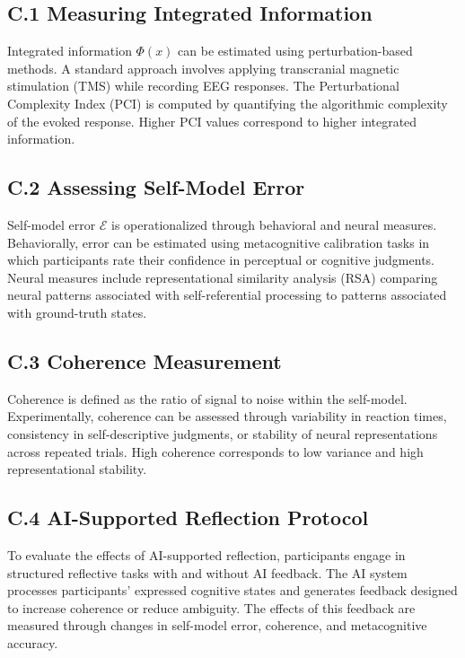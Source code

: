 \documentclass[12pt]{article}
\begin{document}
\subsection*{C.1 Measuring Integrated Information}

Integrated information $\Phi(x)$ can be estimated using perturbation-based methods. A standard approach involves applying transcranial magnetic stimulation (TMS) while recording EEG responses. The Perturbational Complexity Index (PCI) is computed by quantifying the algorithmic complexity of the evoked response. Higher PCI values correspond to higher integrated information.

\subsection*{C.2 Assessing Self-Model Error}

Self-model error $\mathcal{E}$ is operationalized through behavioral and neural measures. Behaviorally, error can be estimated using metacognitive calibration tasks in which participants rate their confidence in perceptual or cognitive judgments. Neural measures include representational similarity analysis (RSA) comparing neural patterns associated with self-referential processing to patterns associated with ground-truth states.

\subsection*{C.3 Coherence Measurement}

Coherence is defined as the ratio of signal to noise within the self-model. Experimentally, coherence can be assessed through variability in reaction times, consistency in self-descriptive judgments, or stability of neural representations across repeated trials. High coherence corresponds to low variance and high representational stability.

\subsection*{C.4 AI-Supported Reflection Protocol}

To evaluate the effects of AI-supported reflection, participants engage in structured reflective tasks with and without AI feedback. The AI system processes participants’ expressed cognitive states and generates feedback designed to increase coherence or reduce ambiguity. The effects of this feedback are measured through changes in self-model error, coherence, and metacognitive accuracy.
\end{document}

